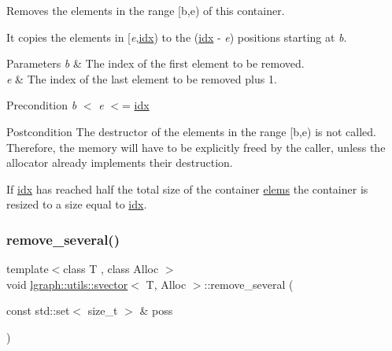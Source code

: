 Removes the elements in the range \mbox{[}b,e) of this container. 

It copies the elements in \mbox{[}{\itshape e},\hyperlink{classlgraph_1_1utils_1_1svector_a7ef963c079c7dc8a6a559ceef81a241f}{idx}) to the (\hyperlink{classlgraph_1_1utils_1_1svector_a7ef963c079c7dc8a6a559ceef81a241f}{idx} -\/ {\itshape e}) positions starting at {\itshape b}.


\begin{DoxyParams}{Parameters}
{\em b} & The index of the first element to be removed. \\
\hline
{\em e} & The index of the last element to be removed plus 1. \\
\hline
\end{DoxyParams}
\begin{DoxyPrecond}{Precondition}
{\itshape b} $<$ {\itshape e} $<$= \hyperlink{classlgraph_1_1utils_1_1svector_a7ef963c079c7dc8a6a559ceef81a241f}{idx} 
\end{DoxyPrecond}
\begin{DoxyPostcond}{Postcondition}
The destructor of the elements in the range \mbox{[}b,e) is not called. Therefore, the memory will have to be explicitly freed by the caller, unless the allocator already implements their destruction.
\end{DoxyPostcond}
If \hyperlink{classlgraph_1_1utils_1_1svector_a7ef963c079c7dc8a6a559ceef81a241f}{idx} has reached half the total size of the container \hyperlink{classlgraph_1_1utils_1_1svector_aa72e9ffeb58f88d3cb01671e3e672a45}{elems} the container is resized to a size equal to \hyperlink{classlgraph_1_1utils_1_1svector_a7ef963c079c7dc8a6a559ceef81a241f}{idx}. \mbox{\label{classlgraph_1_1utils_1_1svector_a59ff2525161af10a94a64a0be8204556}} 
\subsubsection{\texorpdfstring{remove\+\_\+several()}{remove\_several()}}
{\footnotesize\ttfamily template$<$class T , class Alloc $>$ \\
void \hyperlink{classlgraph_1_1utils_1_1svector}{lgraph\+::utils\+::svector}$<$ T, Alloc $>$\+::remove\+\_\+several (\begin{DoxyParamCaption}\item[{const std\+::set$<$ size\+\_\+t $>$ \&}]{poss }\end{DoxyParamCaption})}




